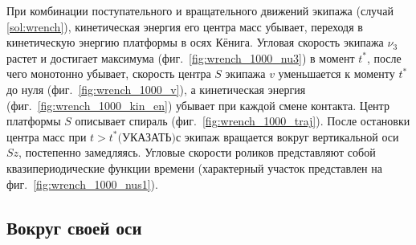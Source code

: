 При комбинации поступательного и вращательного движений экипажа (случай \ref{sol:wrench}), кинетическая энергия его центра масс убывает, переходя в кинетическую энергию платформы в осях Кёнига.
Угловая скорость экипажа $\nu_3$ растет и достигает максимума (фиг.~\ref{fig:wrench_1000_nu3}) в момент $t^*$, после чего монотонно убывает, скорость центра $S$ экипажа $v$ уменьшается к моменту $t^*$ до нуля (фиг.~\ref{fig:wrench_1000_v}), а кинетическая энергия (фиг.~\ref{fig:wrench_1000_kin_en}) убывает при каждой смене контакта. Центр платформы $S$ описывает спираль (фиг.~\ref{fig:wrench_1000_traj}). После остановки центра масс при  $t > t^*  \text{(УКАЗАТЬ)}с$ экипаж вращается вокруг вертикальной оси $Sz$, постепенно замедляясь.  Угловые скорости роликов представляют собой квазипериодические функции времени (характерный участок представлен на фиг.~\ref{fig:wrench_1000_nus1}).

\newpage

\subsection{Вокруг своей оси}


